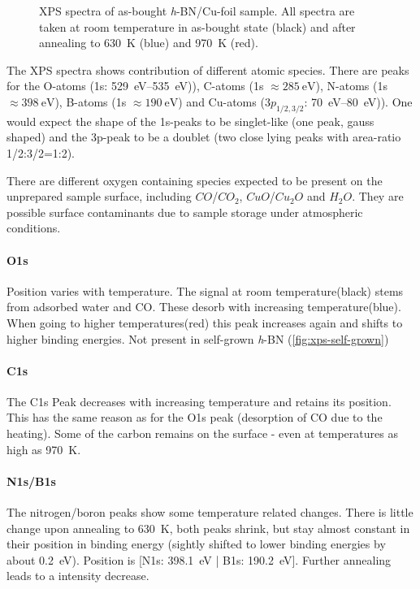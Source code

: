 \begin{figure}[ht]
{	}
	\caption{XPS spectra of as-bought \textit{h}-BN/Cu-foil sample\cite{_graphene_2014}. All spectra are taken at room temperature in as-bought state (black) and after annealing to \SI{630}{\K} (blue) and \SI{970}{\K} (red).}
	\label{fig:xps-bought}
\end{figure}

%

The XPS spectra shows contribution of different atomic species. There are peaks for the O-atoms (1s: \SIrange{529}{535}{\eV})), C-atoms (1s $\approx \SI{285}{\eV}$), N-atoms (1s $\approx \SI{398}{\eV}$), B-atoms (1s $\approx \SI{190}{\eV}$) and Cu-atoms ($3p_{1/2,3/2}$: \SIrange{70}{80}{\eV})). One would expect the shape of the 1s-peaks to be singlet-like (one peak, gauss shaped) and the 3p-peak to be a doublet (two close lying peaks with area-ratio 1/2:3/2=1:2).

There are different oxygen containing species expected to be present on the unprepared sample surface, including $CO$/$CO_2$, $CuO$/$Cu_2O$ and $H_2O$. They are possible surface contaminants due to sample storage under atmospheric conditions.
\paragraph{O1s}
Position varies with temperature. The signal at room temperature(black) stems from adsorbed water and CO. These desorb with increasing temperature(blue). When going to higher temperatures(red) this peak increases again and shifts to higher binding energies. Not present in self-grown \textit{h}-BN (\autoref{fig:xps-self-grown})

\paragraph{C1s}
The C1s Peak decreases with increasing temperature and retains its position. This has the same  reason as for the O1s peak (desorption of CO due to the heating). Some of the carbon remains on the surface - even at temperatures as high as \SI{970}{\K}.

\paragraph{N1s/B1s}
The nitrogen/boron peaks show some temperature related changes. There is little change upon annealing to \SI{630}{\K}, both peaks shrink, but stay almost constant in their position in binding energy (sightly shifted to lower binding energies by about \SI{0.2}{\eV}). Position is [N1s: \SI{398.1}{\eV} | B1s: \SI{190.2}{\eV}]. Further annealing leads to a intensity decrease.

